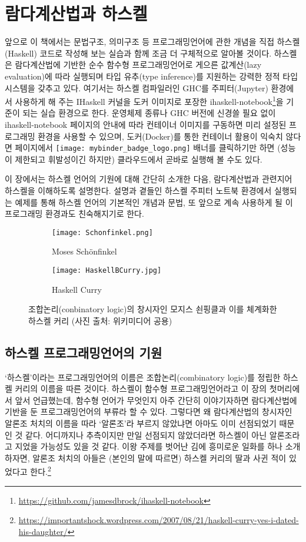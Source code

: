 \chapter{람다계산법과 하스켈}
앞으로 이 책에서는 문법구조, 의미구조 등 프로그래밍언어에 관한
개념을 직접 하스켈(Haskell) 코드로 작성해 보는 실습과 함께
조금 더 구체적으로 알아볼 것이다. 하스켈은 람다계산법에 기반한
순수 함수형 프로그래밍언어로 게으른 값계산(lazy evaluation)에
따라 실행되며 타입 유추(type inference)를 지원하는 강력한
정적 타입 시스템을 갖추고 있다. 여기서는 하스켈 컴파일러인
GHC를 주피터(Jupyter) 환경에서 사용하게 해 주는 IHaskell 커널을
도커 이미지로 포장한 ihaskell-notebook\footnote{%
\url{https://github.com/jamesdbrock/ihaskell-notebook}}을 기준이 되는
실습 환경으로 한다. 운영체제 종류나 GHC 버전에 신경쓸 필요 없이
ihaskell-notebook 페이지의 안내에 따라 컨테이너 이미지를 구동하면
미리 설정된 프로그래밍 환경을 사용할 수 있으며,
도커(Docker)를 통한 컨테이너 활용이 익숙치 않다면 페이지에서
\texttt{[image: mybinder\_badge\_logo.png]} 배너를 클릭하기만 하면
(성능이 제한되고 휘발성이긴 하지만) 클라우드에서 곧바로 실행해 볼 수도 있다.

이 장에서는 하스켈 언어의 기원에 대해 간단히 소개한 다음,
람다계산법과 관련지어 하스켈을 이해하도록 설명한다.
설명과 곁들인 하스켈 주피터 노트북 환경에서 실행되는 예제를 통해
하스켈 언어의 기본적인 개념과 문법, 또 앞으로 계속 사용하게 될
이 프로그래밍 환경과도 친숙해지기로 한다.
\newpage

\begin{figure}\centering
\begin{subfigure}[b]{.3\textwidth}\centering
\texttt{[image: Schonfinkel.png]}
\caption{Moses Sch\"onfinkel}
\end{subfigure}
\begin{subfigure}[b]{.3\textwidth}\centering
\texttt{[image: HaskellBCurry.jpg]}
\caption{Haskell Curry}
\end{subfigure}
\caption{조합논리(conbinatory logic)의 창시자인
         모지스 쇤핑클과 이를 체계화한 하스켈 커리
         {\footnotesize(사진 출처: 위키미디어 공용)} }
\end{figure}

\section{하스켈 프로그래밍언어의 기원}
`하스켈'이라는 프로그래밍언어의 이름은 조합논리(combinatory logic)를
정립한 하스켈 커리의 이름을 따른 것이다. 하스켈이 함수형 프로그래밍언어라고
이 장의 첫머리에서 앞서 언급했는데, 함수형 언어가 무엇인지 아주 간단히
이야기자하면 람다계산법에 기반을 둔 프로그래밍언어의 부류라 할 수 있다.
그렇다면 왜 람다계산법의 창시자인 알론조 처치의 이름을 따라 `알론조'라 부르지
않았냐면 아마도 이미 선점\cite{Ramsdell1989alonzo}되었기 때문인 것 같다.
어디까지나 추측이지만 만일 선점되지 않았더라면 하스켈이 아닌 알론조라고
지었을 가능성도 있을 것 같다. 이왕 주제를 벗어난 김에 흥미로운 일화를 하나
소개하자면, 알론조 처치의 아들은 (본인의 말에 따르면) 하스켈 커리의 딸과
사귄 적이 있었다고 한다.\footnote{%
\url{https://importantshock.wordpress.com/2007/08/21/haskell-curry-yes-i-dated-his-daughter/}}

